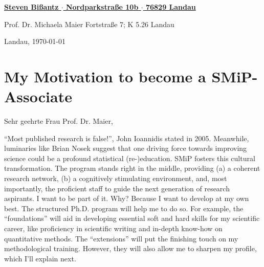 \documentclass[10pt]{FreemanML}
\begin{document}
\begin{paracol}{2}

\switchcolumn %

\color{headings} %
\vspace{2cm} %
\underline{\textbf{\footnotesize{Steven Bißantz $\cdot$ Nordparkstraße 10b $\cdot$ 76829 Landau}}}

\color{text}
\bigskip
\begin{leftbar}
Prof. Dr. Michaela Maier \newline
Fortstraße 7; K 5.26   Landau 
\end{leftbar}

\switchcolumn

\vspace{5cm}
\begin{flushright}
Landau, \today
\end{flushright}
\end{paracol} %

\vspace{1cm}
\section*{My Motivation to become a SMiP-Associate}
\bigskip
Sehr geehrte Frau Prof. Dr. Maier, 
\medskip


\onehalfspacing

\enquote{Most published research is false!}, John Ioannidis stated in 2005.
Meanwhile, luminaries like Brian Nosek suggest that one driving force towards
improving science could be a profound statistical (re-)education. SMiP fosters
this cultural transformation. The program stands right in the middle, providing
(a) a coherent research network, (b) a cognitively stimulating environment,
and, most importantly, the proficient staff to guide the next generation of
research aspirants. I want to be part of it. Why? Because I want to develop at
my own best. The structured Ph.D. program will help me to do so. For example,
the \enquote{foundations} will aid in developing essential soft and hard skills
for my scientific career, like proficiency in scientific writing and in-depth
know-how on quantitative methods. The \enquote{extensions} will put the
finishing touch on my methodological training. However, they will also allow me
to sharpen my profile, which I'll explain next. 
\end{document}
